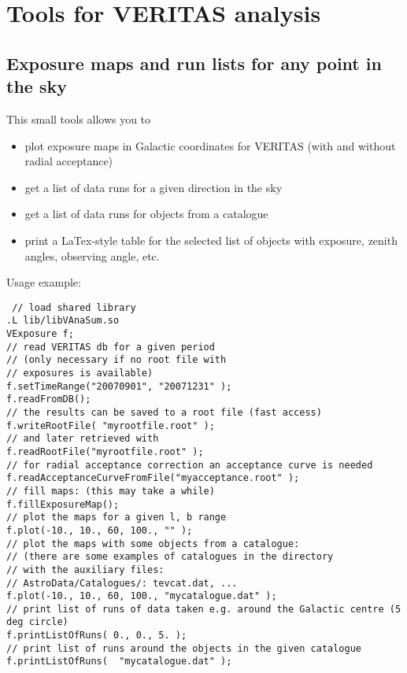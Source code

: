 \documentclass[titlepage,a4paper,twoside,11pt]{report}
\begin{document}

\chapter{Tools for VERITAS analysis}

\section{Exposure maps and run lists for any point in the sky}

This small tools allows you to 

\begin{itemize}
\item plot exposure maps in Galactic coordinates for VERITAS (with and without radial acceptance)
\item get a list of data runs for a given direction in the sky
\item get a list of data runs for objects from a catalogue
\item print a LaTex-style table for the selected list of objects with exposure, zenith angles, observing angle, etc.
\end{itemize}

Usage example:

\begin{lstlisting}
 // load shared library
.L lib/libVAnaSum.so
VExposure f;
// read VERITAS db for a given period
// (only necessary if no root file with
// exposures is available)
f.setTimeRange("20070901", "20071231" );
f.readFromDB();
// the results can be saved to a root file (fast access)
f.writeRootFile( "myrootfile.root" );
// and later retrieved with
f.readRootFile("myrootfile.root" );
// for radial acceptance correction an acceptance curve is needed
f.readAcceptanceCurveFromFile("myacceptance.root" );
// fill maps: (this may take a while)
f.fillExposureMap();
// plot the maps for a given l, b range
f.plot(-10., 10., 60, 100., "" );
// plot the maps with some objects from a catalogue:
// (there are some examples of catalogues in the directory
// with the auxiliary files:
// AstroData/Catalogues/: tevcat.dat, ... 
f.plot(-10., 10., 60, 100., "mycatalogue.dat" );
// print list of runs of data taken e.g. around the Galactic centre (5 deg circle)
f.printListOfRuns( 0., 0., 5. ); 
// print list of runs around the objects in the given catalogue
f.printListOfRuns(  "mycatalogue.dat" );
\end{lstlisting}
\end{document}
